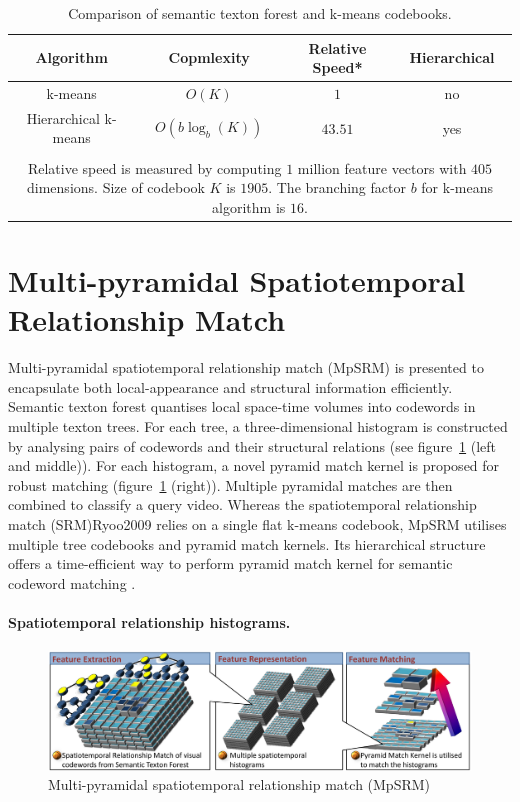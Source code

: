 \begin{table}
\begin{center}
{\footnotesize
\begin{tabular}{|c|c|c|c|}
\hline
\textbf{ Algorithm} & \textbf{ Copmlexity} & \textbf{ Relative Speed}* & \textbf{ Hierarchical} \\
\hline
\hline
k-means & $O(K)$ & $1$ & no \\
Hierarchical k-means & $O(b\log_{b}(K))$ & $43.51$ & yes \\
{\color{blue}{STF}} & {\color{blue}{ $ O(\log_{2}(K)) $ }} & {\color{blue}{$559.86$}} & {\color{blue}{yes}}\\
\hline
\multicolumn{4}{p{0.75\linewidth}}{\scriptsize Relative speed is measured by computing $1$ million feature vectors with $405$ dimensions. Size of codebook $K$ is $1905$. The branching factor $b$ for k-means algorithm is $16$.}
\end{tabular}
}
\end{center}
\caption{Comparison of semantic texton forest and k-means codebooks.}
\label{tab:codebook}
\end{table}

\section{Multi-pyramidal Spatiotemporal Relationship Match}
\label{sec: MpSRM}
Multi-pyramidal spatiotemporal relationship match (MpSRM) is presented to encapsulate both local-appearance and structural information efficiently. Semantic texton forest quantises local space-time volumes into codewords in multiple texton trees. For each tree, a three-dimensional histogram is constructed by analysing pairs of codewords and their structural relations (see figure~\ref{img:mpsrm} (left and middle)). For each histogram, a novel pyramid match kernel is proposed for robust matching (figure~\ref{img:mpsrm} (right)). Multiple pyramidal matches are then combined to classify a query video. Whereas the spatiotemporal relationship match (SRM){Ryoo2009} relies on a single flat k-means codebook, MpSRM utilises multiple tree codebooks and pyramid match kernels. Its hierarchical structure offers a time-efficient way to perform pyramid match kernel for semantic codeword matching \cite{Grauman2005}.\vspace{-3mm}
\paragraph{Spatiotemporal relationship histograms.}
\begin{figure}
\includegraphics[width=1\linewidth]{fig/actreg/fig4.pdf}%
\caption{Multi-pyramidal spatiotemporal relationship match (MpSRM)}
\label{img:mpsrm}
\end{figure}

